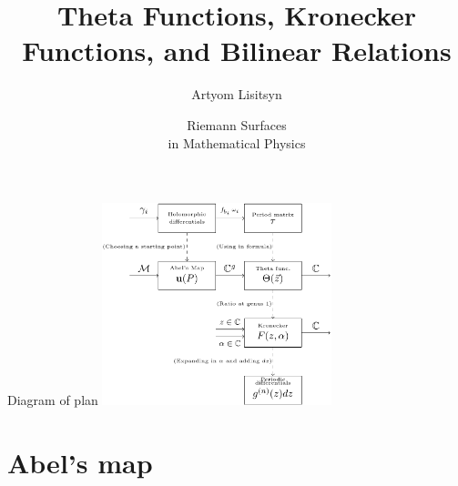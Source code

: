 \documentclass[11pt,aspectratio=169]{beamer}
\title{Theta Functions, Kronecker Functions, and Bilinear Relations}
\date[2023]{Riemann Surfaces \\ in Mathematical Physics}
\author{Artyom Lisitsyn}
\institute{D-PHYS}
\begin{document}
\def\titlefigure{assets/ThetaBigMonoCrop.png}
\titleframe{}

\begin{frame}{Diagram of plan}
    \center
    \includegraphics[width=0.5\textwidth]{assets/diagram.png}
\end{frame}

\tocframe{}

\section{Abel's map}
\end{document}
